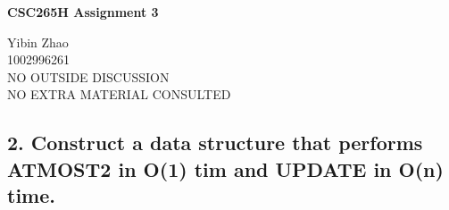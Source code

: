 \documentclass[10pt]{article}
\begin{document}
\begin{center}
{\bf \Large \bf CSC265H Assignment 3}\\
\end{center}

\noindent
Yibin Zhao\\
1002996261\\
NO OUTSIDE DISCUSSION\\
NO EXTRA MATERIAL CONSULTED\\

\begin{comment}
Consider a sequence A[1..n], each of whose entries is an element of $\{1,
\ldots, n^2\}$, that supports two operations:
	UPDATE(i, v), for $1 \leq i \leq n$ and $v \in \{1, \ldots, n^2\}$, which
	sets A[i] to v and 
	ATMOST2(i,j), for $1 \leq i < j \leq n$, which returns T if A[i..j]
	contains at most two different numbers and returns F is A[i..j] contains at
	least three different numbers.

1. Construct a data structure that performs both opertations in O(log n) time.

2. Construct a data structure that performs ATMOST2 in O(1) time and UPDATE in
O(n) time.

Both data stuctures must use O(n) words, each with O(log n bits.

For each data structure:
	a. Brirfly describe it and explain why it has the required space
	complexity.
	b. Draw a picture of it when A[1..8]= [2,3,2,2,2,1,3,1].
	c. Describe how to perform UPDATE.
	d. Explain why the UPDATE algorithm is correct.
	e. Explain ehy the UPDATE algorithm had the required time complexity.
	f. Describe how to perform ATMOST2.
	g. Explain why the ATMOST2 algorithm is correct.
	h. Explain why the ATMOST2 algorithm has the required time complexity.
\end{comment}

\subsection*{2. Construct a data structure that performs ATMOST2 in O(1) tim
and UPDATE in O(n) time.}
\end{document}
